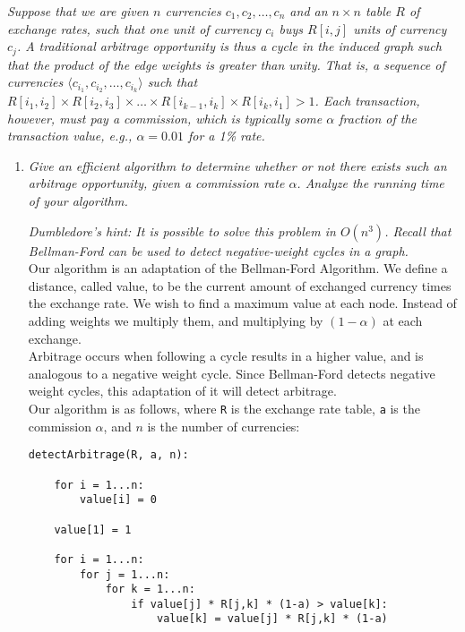 \documentclass[12pt]{article}
\begin{document}
\begin{enumerate}
    \textit{Suppose that we are given $n$ currencies $c_1, c_2, \hdots , c_n$ and an $n \times n$ table $R$ of exchange rates, such that one unit of currency 
$c_i$ buys $R[i, j]$ units of currency $c_j$. A traditional arbitrage opportunity is thus a cycle in the induced graph such that the product of the edge 
weights is greater than unity. That is, a sequence of currencies $\langle c_{i_1}, c_{i_2}, \hdots , c_{i_k} \rangle$ such that $R[i_1, i_2] \times R[i_2, 
i_3] \times \hdots \times R[i_{k - 1}, i_k] \times R[i_k, i_1] > 1$. Each transaction, however, must pay a commission, which is typically some $\alpha$ 
fraction of the transaction value, e.g., $\alpha = 0.01$ for a 1\% rate.}
    \begin{enumerate}
         \item \textit{Give an efficient algorithm to determine whether or not there exists such an arbitrage opportunity, given a commission rate $\alpha$. 
Analyze the running time of your algorithm.}
         
         \textit{Dumbledore's hint: It is possible to solve this problem in $O(n^3)$. Recall that Bellman-Ford can be used to detect negative-weight cycles in 
a graph.}\\
         
         Our algorithm is an adaptation of the Bellman-Ford Algorithm. We define a distance, called value, to be the current amount of exchanged currency 
times the exchange rate. We wish to find a maximum value at each node. Instead of adding weights we multiply them, and multiplying by $(1-\alpha)$ at each 
exchange.\\
         
         Arbitrage occurs when following a cycle results in a higher value, and is analogous to a negative weight cycle. Since Bellman-Ford detects negative 
weight cycles, this adaptation of it will detect arbitrage.\\
         
         Our algorithm is as follows, where {\tt R} is the exchange rate table, {\tt a} is the commission $\alpha$, and $n$ is the number of currencies:
         \newpage
         \begin{small}
         \begin{verbatim}
detectArbitrage(R, a, n):
    
    for i = 1...n:
        value[i] = 0
        
    value[1] = 1

    for i = 1...n:
        for j = 1...n:
            for k = 1...n:
                if value[j] * R[j,k] * (1-a) > value[k]:
                    value[k] = value[j] * R[j,k] * (1-a)
                    

\end{verbatim}
\end{small}
\end{enumerate}
\end{enumerate}
\end{document}
